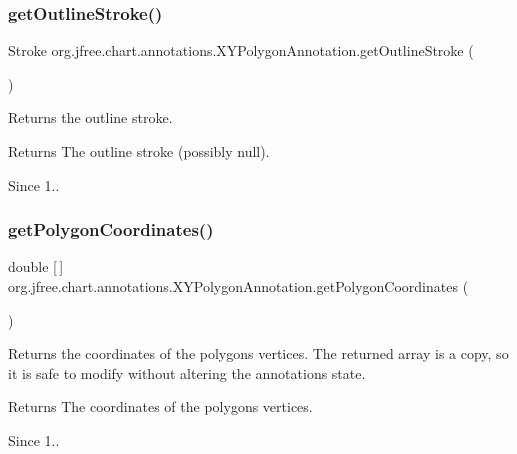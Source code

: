 \subsubsection{\texorpdfstring{get\+Outline\+Stroke()}{getOutlineStroke()}}
{\footnotesize\ttfamily Stroke org.\+jfree.\+chart.\+annotations.\+X\+Y\+Polygon\+Annotation.\+get\+Outline\+Stroke (\begin{DoxyParamCaption}{ }\end{DoxyParamCaption})}

Returns the outline stroke.

\begin{DoxyReturn}{Returns}
The outline stroke (possibly {\ttfamily null}).
\end{DoxyReturn}
\begin{DoxySince}{Since}
1.. 
\end{DoxySince}
\mbox{\label{classorg_1_1jfree_1_1chart_1_1annotations_1_1_x_y_polygon_annotation_a280f24e4688cdcfeb390728028f204c4}} 
\subsubsection{\texorpdfstring{get\+Polygon\+Coordinates()}{getPolygonCoordinates()}}
{\footnotesize\ttfamily double \mbox{[}$\,$\mbox{]} org.\+jfree.\+chart.\+annotations.\+X\+Y\+Polygon\+Annotation.\+get\+Polygon\+Coordinates (\begin{DoxyParamCaption}{ }\end{DoxyParamCaption})}

Returns the coordinates of the polygon\textquotesingle{}s vertices. The returned array is a copy, so it is safe to modify without altering the annotation\textquotesingle{}s state.

\begin{DoxyReturn}{Returns}
The coordinates of the polygon\textquotesingle{}s vertices.
\end{DoxyReturn}
\begin{DoxySince}{Since}
1.. 
\end{DoxySince}
\mbox{\label{classorg_1_1jfree_1_1chart_1_1annotations_1_1_x_y_polygon_annotation_a3b5b07070db324165da5b05b417262de}} 
